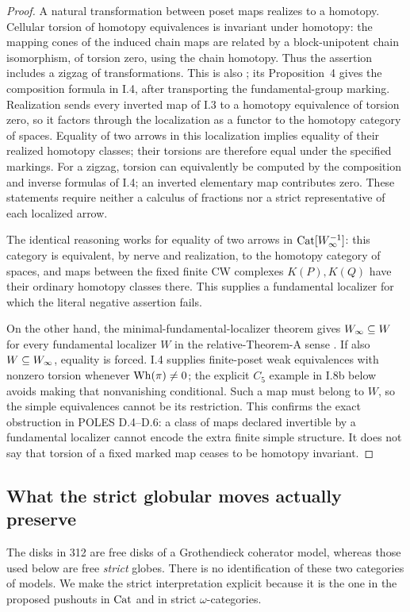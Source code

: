 \begin{proof}
A natural transformation between poset maps realizes to a homotopy.
Cellular torsion of homotopy equivalences is invariant under homotopy:
the mapping cones of the induced chain maps are related by a
block-unipotent chain isomorphism, of torsion zero, using the chain
homotopy. Thus the assertion includes a zigzag of transformations.
This is also \cite[Proposition~1]{I_LurieWhiteheadII}; its
Proposition~4 gives the composition formula in I.4, after transporting
the fundamental-group marking.
Realization sends every inverted map of I.3 to a homotopy equivalence
of torsion zero, so it factors through the localization as a functor
to the homotopy category of spaces. Equality of two arrows in this
localization implies equality of their realized homotopy classes;
their torsions are therefore equal under the specified markings.
For a zigzag, torsion can equivalently be computed by the composition
and inverse formulas of I.4; an inverted elementary map contributes
zero. These statements require neither a calculus of fractions nor a
strict representative of each localized arrow.

The identical reasoning works for equality of two arrows in
$\mathrm{Cat}[W_\infty^{-1}]$: this category is equivalent, by nerve and
realization, to the homotopy category of spaces, and maps between the
fixed finite CW complexes $K(P),K(Q)$ have their ordinary homotopy
classes there. This supplies a fundamental localizer for which the
literal negative assertion fails.

On the other hand, the minimal-fundamental-localizer theorem gives
$W_\infty\subseteq W$ for every fundamental localizer $W$ in the
relative-Theorem-A sense \cite[Corollary~4.2.19]{I_Cisinski2006}.
If also $W\subseteq W_\infty$, equality is
forced. I.4 supplies finite-poset weak equivalences with nonzero
torsion whenever $\operatorname{Wh}(\pi)\ne0$; the explicit $C_5$ example in I.8b
below avoids making that nonvanishing conditional. Such a map must
belong to $W$, so the simple equivalences cannot be its restriction.
This confirms the exact obstruction in POLES D.4--D.6: a class of
maps declared invertible by a fundamental localizer cannot encode the
extra finite simple structure. It does not say that torsion of a
fixed marked map ceases to be homotopy invariant.
\end{proof}

\subsection{What the strict globular moves actually preserve}
The disks in 312 are free disks of a Grothendieck coherator model,
whereas those used below are free \emph{strict} globes. There is no
identification of these two categories of models. We make the strict
interpretation explicit because it is the one in the proposed
pushouts in $\mathrm{Cat}$ and in strict $\omega$-categories.

